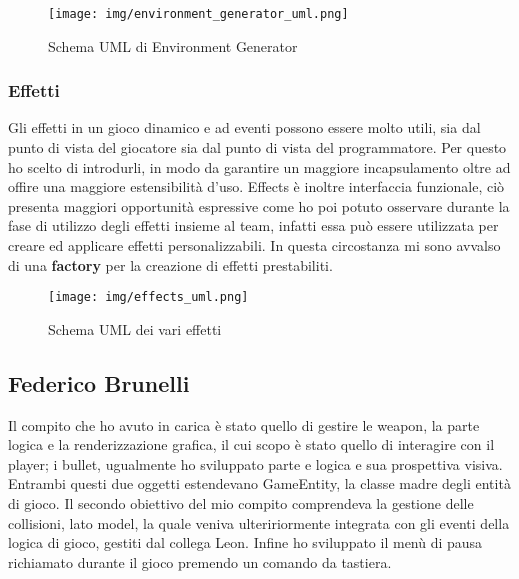 \begin{figure}[H]
	\centering{}
	\texttt{[image: img/environment\_generator\_uml.png]}
	\label{img:environment_generator_uml.png}
	\caption{Schema UML di Environment Generator\\}
\end{figure}

\subsubsection{Effetti}
Gli effetti in un gioco dinamico e ad eventi possono essere molto utili, sia dal punto di vista del giocatore sia dal punto di vista del programmatore.
Per questo ho scelto di introdurli, in modo da garantire un maggiore incapsulamento oltre ad offire una maggiore estensibilità d'uso. 
Effects è inoltre interfaccia funzionale, ciò presenta maggiori opportunità espressive come ho poi potuto osservare durante la fase di utilizzo degli effetti insieme al team, infatti essa può essere utilizzata per creare ed applicare effetti personalizzabili. In questa circostanza mi sono avvalso di una \textbf{factory} per la creazione di effetti prestabiliti.

\begin{figure}[H]
	\centering{}
	\texttt{[image: img/effects\_uml.png]}
	\label{img:effects_uml.png}
	\caption{Schema UML dei vari effetti\\}
\end{figure}



\newpage

\subsection*{Federico Brunelli}

\textsf{\small Il compito che ho avuto in carica è stato quello di gestire le weapon, la parte logica e la renderizzazione grafica, il cui scopo è stato quello di interagire con il player; i bullet, ugualmente ho sviluppato parte e logica e sua prospettiva visiva.}\\

\textsf{\small Entrambi questi due oggetti estendevano GameEntity, la classe madre degli entità di gioco.
Il secondo obiettivo del mio compito comprendeva la gestione delle collisioni, lato model, la quale veniva ulteririormente integrata con gli eventi della logica di gioco, gestiti dal collega Leon.
Infine ho sviluppato il menù di pausa richiamato durante il gioco premendo un comando da tastiera.}

